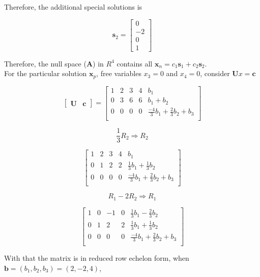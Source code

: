 \documentclass[main.tex]{subfiles}
\begin{document}
\begin{enumerate}
\begin{enumerate}
        Therefore, the additional special solutions is 
        
        $$\textbf{s}_2=\left[\begin{array}{c}0 \\ -2 \\ 0 \\ 1\end{array}\right]$$
        
        Therefore, the null space  (\textbf{A}) in $R^4$ contains all $\textbf{x}_n=c_1 \textbf{s}_1+c_2 \textbf{s}_2$.\\ 
        
        For the particular solution $\textbf{x}_p$, free variables $x_3=0$ and $x_4=0$, consider $\textbf{U} x=\textbf{c}$

        $$
        \left[\begin{array}{ll} \textbf{U} & \textbf{c} \end{array}\right] =
        \begin{bmatrix} 
    	1 & 2 & 3 & 4 & b_1\\
    	0 & 3 & 6 & 6 & b_1 + b_2 \\
    	0 & 0 & 0 & 0 & \frac{-4}{3}b_1 + \frac{2}{3}b_2 + b_3 \\
        \end{bmatrix}
        $$

        $$\frac{1}{3} R_2 \Rightarrow R_2$$  

        $$
        \begin{bmatrix} 
    	1 & 2 & 3 & 4 & b_1\\
    	0 & 1 & 2 & 2 & \frac{1}{3}b_1 + \frac{1}{3}b_2 \\
    	0 & 0 & 0 & 0 & \frac{-4}{3}b_1 + \frac{2}{3}b_2 + b_3 \\
        \end{bmatrix}
        $$

        $$R_1 - 2R_2 \Rightarrow R_1$$ 

        $$
        \begin{bmatrix} 
    	1 & 0 & -1 & 0 & \frac{1}{3}b_1 - \frac{2}{3}b_2 \\
    	0 & 1 & 2 & 2 & \frac{1}{3}b_1 + \frac{1}{3}b_2 \\
    	0 & 0 & 0 & 0 & \frac{-4}{3}b_1 + \frac{2}{3}b_2 + b_3 \\
        \end{bmatrix}
        $$

        With that the matrix is in reduced row echelon form, when $\textbf{b}=\left(b_1, b_2, b_3\right)=(2,-2,4)$, 


\end{enumerate}
\end{enumerate}
\end{document}
